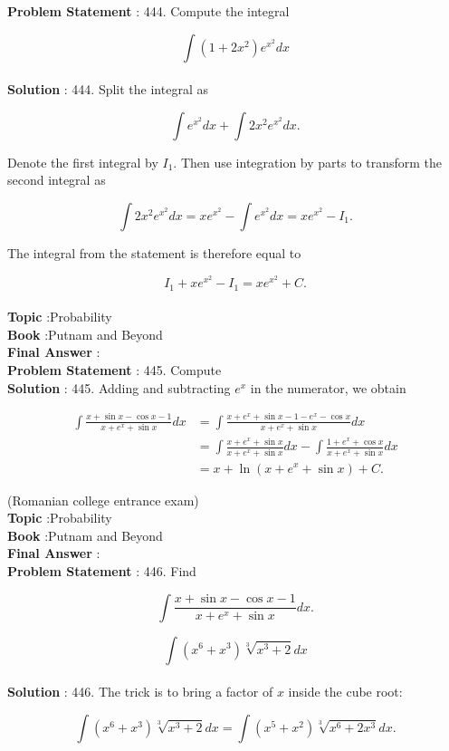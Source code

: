 \documentclass[10pt]{article}
\begin{document}
\textbf{Problem Statement} :
444. Compute the integral

$$
\int\left(1+2 x^{2}\right) e^{x^{2}} d x
$$
\\
\textbf{Solution} :
444. Split the integral as

$$
\int e^{x^{2}} d x+\int 2 x^{2} e^{x^{2}} d x .
$$

Denote the first integral by $I_{1}$. Then use integration by parts to transform the second integral as

$$
\int 2 x^{2} e^{x^{2}} d x=x e^{x^{2}}-\int e^{x^{2}} d x=x e^{x^{2}}-I_{1} .
$$

The integral from the statement is therefore equal to

$$
I_{1}+x e^{x^{2}}-I_{1}=x e^{x^{2}}+C .
$$
\\
\textbf{Topic} :Probability\\
\textbf{Book} :Putnam and Beyond\\
\textbf{Final Answer} :\\


\textbf{Problem Statement} :
445. Compute
\\
\textbf{Solution} :
445. Adding and subtracting $e^{x}$ in the numerator, we obtain

$$
\begin{aligned}
\int \frac{x+\sin x-\cos x-1}{x+e^{x}+\sin x} d x &=\int \frac{x+e^{x}+\sin x-1-e^{x}-\cos x}{x+e^{x}+\sin x} d x \\
&=\int \frac{x+e^{x}+\sin x}{x+e^{x}+\sin x} d x-\int \frac{1+e^{x}+\cos x}{x+e^{x}+\sin x} d x \\
&=x+\ln \left(x+e^{x}+\sin x\right)+C .
\end{aligned}
$$

(Romanian college entrance exam)
\\
\textbf{Topic} :Probability\\
\textbf{Book} :Putnam and Beyond\\
\textbf{Final Answer} :\\


\textbf{Problem Statement} :
446. Find

$$
\int \frac{x+\sin x-\cos x-1}{x+e^{x}+\sin x} d x .
$$

$$
\int\left(x^{6}+x^{3}\right) \sqrt[3]{x^{3}+2} d x
$$
\\
\textbf{Solution} :
446. The trick is to bring a factor of $x$ inside the cube root:

$$
\int\left(x^{6}+x^{3}\right) \sqrt[3]{x^{3}+2} d x=\int\left(x^{5}+x^{2}\right) \sqrt[3]{x^{6}+2 x^{3}} d x .
$$
\end{document}
